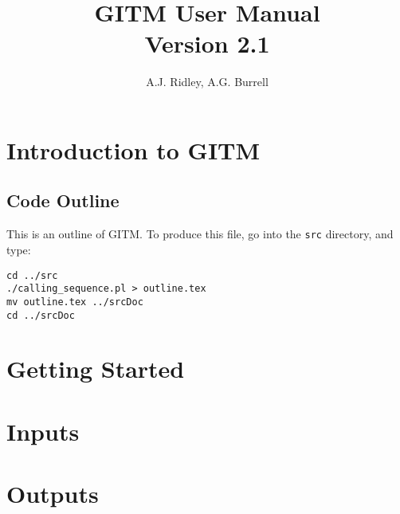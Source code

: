 \documentclass[twoside,10pt]{book}
\title{GITM User Manual \\ \large Version 2.1}
\author{A.J. Ridley, A.G. Burrell}
\begin{document}
\pagestyle{fancy}
\lhead[\fancyplain{}{\bfseries\thepage}]{\fancyplain{}{\bfseries\rightmark}}
\rhead[\fancyplain{}{\bfseries\leftmark}]{\fancyplain{}{\bfseries\thepage}}
\cfoot{}


\maketitle

\tableofcontents

\clearpage

\chapter{Introduction to GITM}

\label{intro.ch}

\section{Code Outline}
\label{outline.sec}

This is an outline of GITM.  To produce this file, go into the {\tt src} directory, and type:

\begin{verbatim}
cd ../src
./calling_sequence.pl > outline.tex
mv outline.tex ../srcDoc
cd ../srcDoc
\end{verbatim}



\chapter{Getting Started}
\label{quickstart.ch}


\chapter{Inputs}
\label{input.ch}




\chapter{Outputs}
\label{outputs.ch}


\clearpage
{}


\end{document}
